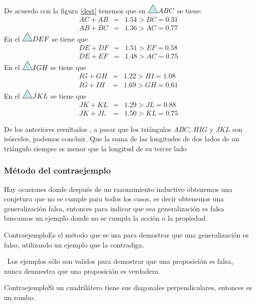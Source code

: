De acuerdo con la figura \ref{dest} tenemos que en $\triangulo ABC $ se tiene: \begin{eqnarray} 
AC+AB & = & 1.54 > BC = 0.31 \\
AB + BC & = & 1.36> AC =  0.77 \end{eqnarray}
En el $\triangulo DEF$ se tiene que  
\begin{eqnarray}
DE+DF & = & 1.51 > EF=0.58 \\
DE + EF &=& 1.48> AC =0.75 \end{eqnarray}
En el $\triangulo IGH$ se tiene que 
\begin{eqnarray} IG+GH & = & 1.22 > HI=1.08 \\
IG + IH &=& 1.69> GH=0.61 \end{eqnarray} 
En el $\triangulo JKL$ se tiene que 
\begin{eqnarray}
JK+KL & = & 1.29 > JL=0.88 \\
JK + JL &=& 1.50> KL=0.75 
\end{eqnarray}

De los anteriores resultados , a pesar que los triángulos $ABC$,
$HIG$ y $JKL$ son isósceles, podemos concluir. \textquotedbl{} Que
la suma de las longitudes de dos lados de un triángulo siempre es
menor que la longitud de su tercer lado\textquotedbl{}


\subsubsection{Método del contraejemplo}

Hay ocasiones donde después de un razonamiento inductivo obtenemos
una conjetura que no se cumple para todos los casos, es decir obtenemos
una generalización falsa, entonces para indicar que esa generalización
es falsa buscamos un ejemplo donde no se cumpla la acción o la propiedad. 

\begin{ideas}{Contraejemplo}Es el método que se usa para demostrar
que una generalización es falsa, utilizando un ejemplo que la contradiga.
\end{ideas}

\nota\ Los ejemplos sólo son validos para demostrar que una proposición
es falsa, nunca demuestra que una proposición es verdadera. \begin{ejem}{Contraejemplo}Si
un cuadrilátero tiene sus diagonales perpendiculares, entonces es
un rombo.\end{ejem}

